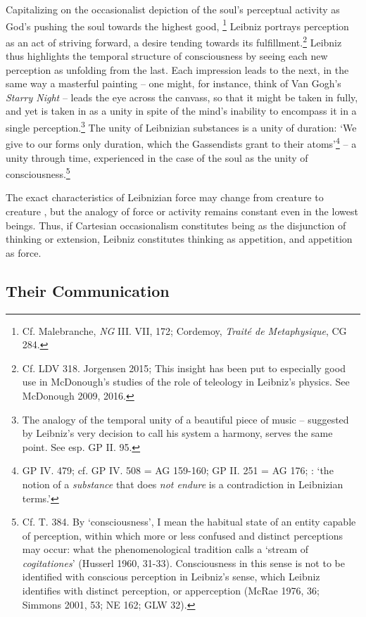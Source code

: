 \documentclass{article}
\begin{document}
Capitalizing on the occasionalist depiction of the soul's perceptual
activity as God's pushing the soul towards the highest good, \footnote{Cf.
  Malebranche, \emph{NG} III. VII, 172; Cordemoy, \emph{Traité de
  Metaphysique}, CG 284.} Leibniz portrays perception as an act of
striving forward, a desire tending towards its fulfillment.\footnote{Cf.
  LDV 318. Jorgensen 2015; This insight has been put to especially good
  use in McDonough's studies of the role of teleology in Leibniz's
  physics. See McDonough 2009, 2016.} Leibniz thus highlights the
temporal structure of consciousness by seeing each new perception as
unfolding from the last. Each impression leads to the next, in the same
way a masterful painting -- one might, for instance, think of Van Gogh's
\emph{Starry Night} -- leads the eye across the canvass, so that it
might be taken in fully, and yet is taken in as a unity in spite of the
mind's inability to encompass it in a single perception.\footnote{The
  analogy of the temporal unity of a beautiful piece of music --
  suggested by Leibniz's very decision to call his system a harmony,
  serves the same point. See esp. GP II. 95.} The unity of Leibnizian
substances is a unity of duration: `We give to our forms only duration,
which the Gassendists grant to their atoms'\footnote{GP IV. 479; cf. GP
  IV. 508 = AG 159-160; GP II. 251 = AG 176; \autocite[870]{Whipple2010}: `the
  notion of a \emph{substance} that does \emph{not endure} is a
  contradiction in Leibnizian terms.'} -- a unity through time,
experienced in the case of the soul as the unity of
consciousness.\footnote{Cf. T. 384. By `consciousness', I mean the
  habitual state of an entity capable of perception, within which more
  or less confused and distinct perceptions may occur: what the
  phenomenological tradition calls a `stream of \emph{cogitationes}'
  (Husserl 1960, 31-33). Consciousness in this sense is not to be
  identified with conscious perception in Leibniz's sense, which Leibniz
  identifies with distinct perception, or apperception (McRae 1976, 36;
  Simmons 2001, 53; NE 162; GLW 32).}

The exact characteristics of Leibnizian force may change from creature
to creature , but the analogy of force or activity remains constant even
in the lowest beings. Thus, if Cartesian occasionalism constitutes being
as the disjunction of thinking or extension, Leibniz constitutes
thinking as appetition, and appetition as force.

\subsection{Their Communication}
\end{document}
